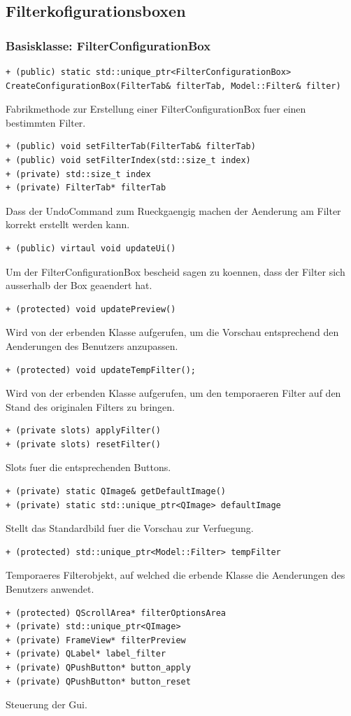 \documentclass[parskip=full]{scrartcl}
\begin{document}
\subsection{Filterkofigurationsboxen}
\subsubsection{Basisklasse: FilterConfigurationBox}
\begin{verbatim}
+ (public) static std::unique_ptr<FilterConfigurationBox>
CreateConfigurationBox(FilterTab& filterTab, Model::Filter& filter)
\end{verbatim}
Fabrikmethode zur Erstellung einer FilterConfigurationBox fuer einen bestimmten Filter.
\begin{verbatim}
+ (public) void setFilterTab(FilterTab& filterTab)
+ (public) void setFilterIndex(std::size_t index)
+ (private) std::size_t index
+ (private) FilterTab* filterTab
\end{verbatim}
Dass der UndoCommand zum Rueckgaengig machen der Aenderung am Filter korrekt erstellt werden kann.
\begin{verbatim}
+ (public) virtaul void updateUi()
\end{verbatim}
Um der FilterConfigurationBox bescheid sagen zu koennen, dass der Filter sich ausserhalb der Box geaendert hat.
\begin{verbatim}
+ (protected) void updatePreview()
\end{verbatim}
Wird von der erbenden Klasse aufgerufen, um die Vorschau entsprechend den Aenderungen des Benutzers anzupassen.
\begin{verbatim}
+ (protected) void updateTempFilter();
\end{verbatim}
Wird von der erbenden Klasse aufgerufen, um den temporaeren Filter auf den Stand des originalen Filters zu bringen.
\begin{verbatim}
+ (private slots) applyFilter()
+ (private slots) resetFilter()
\end{verbatim}
Slots fuer die entsprechenden Buttons.
\begin{verbatim}
+ (private) static QImage& getDefaultImage()
+ (private) static std::unique_ptr<QImage> defaultImage
\end{verbatim}
Stellt das Standardbild fuer die Vorschau zur Verfuegung.
\begin{verbatim}
+ (protected) std::unique_ptr<Model::Filter> tempFilter
\end{verbatim}
Temporaeres Filterobjekt, auf welched die erbende Klasse die Aenderungen des Benutzers anwendet.
\begin{verbatim}
+ (protected) QScrollArea* filterOptionsArea
+ (private) std::unique_ptr<QImage>
+ (private) FrameView* filterPreview
+ (private) QLabel* label_filter
+ (private) QPushButton* button_apply
+ (private) QPushButton* button_reset
\end{verbatim}
Steuerung der Gui.
\end{document}
